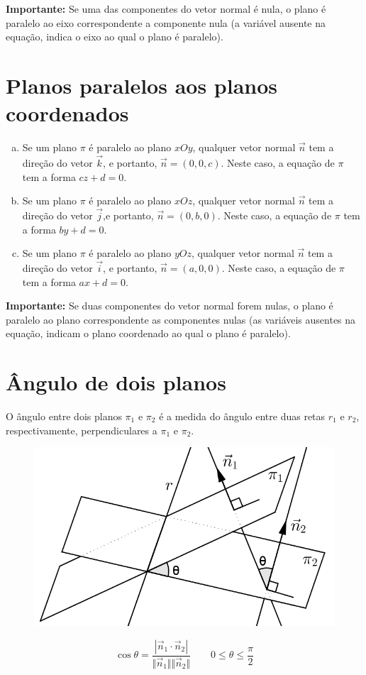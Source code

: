 \textbf{Importante:} Se uma das componentes do vetor normal é nula, o plano é paralelo ao eixo correspondente a componente nula (a variável ausente na equação, indica o eixo ao qual o plano é paralelo).

\section{Planos paralelos aos planos coordenados}

\begin{enumerate}[(a)]
 \item Se um plano $\pi$ é paralelo ao plano $xOy$, qualquer vetor normal $\vec n$ tem a direção do vetor $\vec k$, e portanto, $\vec n=(0,0,c)$. Neste caso, a equação de $\pi$ tem a forma $cz+d=0$.
 \item Se um plano $\pi$ é paralelo ao plano $xOz$, qualquer vetor normal $\vec n$ tem a  direção do vetor $\vec j$,e portanto, $\vec n=(0,b,0)$. Neste caso, a equação de $\pi$ tem a forma $by+d=0$.
 \item Se um plano $\pi$ é paralelo ao plano $yOz$, qualquer vetor normal $\vec n$ tem a direção do vetor $\vec i$, e portanto, $\vec n=(a,0,0)$. Neste caso, a equação de $\pi$ tem a forma $ax+d=0$.
\end{enumerate}

\textbf{Importante:} Se duas componentes do vetor normal forem nulas, o plano é  paralelo ao plano correspondente as componentes nulas (as variáveis ausentes na equação, indicam o plano coordenado ao qual o plano é paralelo).

\section{Ângulo de dois planos}

O ângulo entre dois planos $\pi_1$ e $\pi_2$ é a medida do ângulo entre duas retas $r_1$ e $r_2$, respectivamente, perpendiculares a $\pi_1$ e $\pi_2$.

\begin{multicols}{2}
\begin{figure}[H]
\centering
\includegraphics[scale=1]{analitica/imagens/planos-ang.png}
\end{figure}

$$\cos{\theta}=\frac{|\vec n_1 \cdot \vec n_2|}{\Vert \vec n_1 \Vert \Vert \vec n_2 \Vert} \qquad 0\leq \theta \leq \frac{\pi}{2}$$

\end{multicols}

